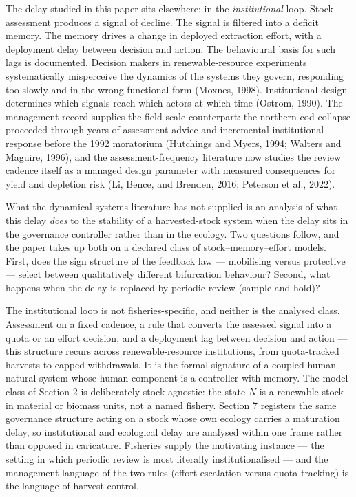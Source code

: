 \documentclass[11pt]{article}
\begin{document}
The delay studied in this paper sits elsewhere: in the
\emph{institutional} loop. Stock assessment produces a signal of
decline. The signal is filtered into a deficit memory. The memory drives
a change in deployed extraction effort, with a deployment delay between
decision and action. The behavioural basis for such lags is documented.
Decision makers in renewable-resource experiments systematically
misperceive the dynamics of the systems they govern, responding too
slowly and in the wrong functional form (Moxnes, 1998). Institutional
design determines which signals reach which actors at which time
(Ostrom, 1990). The management record supplies the field-scale
counterpart: the northern cod collapse proceeded through years of
assessment advice and incremental institutional response before the 1992
moratorium (Hutchings and Myers, 1994; Walters and Maguire, 1996), and
the assessment-frequency literature now studies the review cadence
itself as a managed design parameter with measured consequences for
yield and depletion risk (Li, Bence, and Brenden, 2016; Peterson et al.,
2022).

What the dynamical-systems literature has not supplied is an analysis of
what this delay \emph{does} to the stability of a harvested-stock system
when the delay sits in the governance controller rather than in the
ecology. Two questions follow, and the paper takes up both on a declared
class of stock--memory--effort models. First, does the sign structure of
the feedback law --- mobilising versus protective --- select between
qualitatively different bifurcation behaviour? Second, what happens when
the delay is replaced by periodic review (sample-and-hold)?

The institutional loop is not fisheries-specific, and neither is the
analysed class. Assessment on a fixed cadence, a rule that converts the
assessed signal into a quota or an effort decision, and a deployment lag
between decision and action --- this structure recurs across
renewable-resource institutions, from quota-tracked harvests to capped
withdrawals. It is the formal signature of a coupled human--natural
system whose human component is a controller with memory. The model
class of Section 2 is deliberately stock-agnostic: the state \(N\) is a
renewable stock in material or biomass units, not a named fishery.
Section 7 registers the same governance structure acting on a stock
whose own ecology carries a maturation delay, so institutional and
ecological delay are analysed within one frame rather than opposed in
caricature. Fisheries supply the motivating instance --- the setting in
which periodic review is most literally institutionalised --- and the
management language of the two rules (effort escalation versus quota
tracking) is the language of harvest control.
\end{document}
